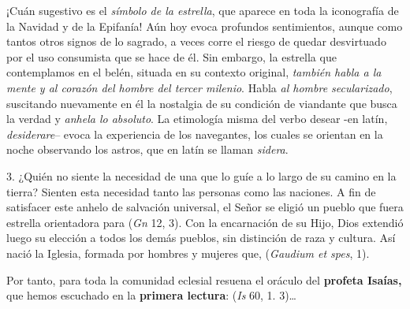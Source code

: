 ¡Cuán sugestivo es el \emph{símbolo de la estrella}, que aparece en toda la iconografía de la Navidad y de la Epifanía! Aún hoy evoca profundos sentimientos, aunque como tantos otros signos de lo sagrado, a veces corre el riesgo de quedar desvirtuado por el uso consumista que se hace de él. Sin embargo, la estrella que contemplamos en el belén, situada en su contexto original, \emph{también habla a la mente y al corazón del hombre del tercer milenio}. Habla \emph{al hombre secularizado}, suscitando nuevamente en él la nostalgia de su condición de viandante que busca la verdad y \emph{anhela lo absoluto}. La etimología misma del verbo desear -en latín, \emph{desiderare}-- evoca la experiencia de los navegantes, los cuales se orientan en la noche observando los astros, que en latín se llaman \emph{sidera}.

3. ¿Quién no siente la necesidad de una  que lo guíe a lo largo de su camino en la tierra? Sienten esta necesidad tanto las personas como las naciones. A fin de satisfacer este anhelo de salvación universal, el Señor se eligió un pueblo que fuera estrella orientadora para  (\emph{Gn} 12, 3). Con la encarnación de su Hijo, Dios extendió luego su elección a todos los demás pueblos, sin distinción de raza y cultura. Así nació la Iglesia, formada por hombres y mujeres que,  (\emph{Gaudium et spes}, 1).

Por tanto, para toda la comunidad eclesial resuena el oráculo del \textbf{profeta Isaías,} que hemos escuchado en la \textbf{primera lectura}:  (\emph{Is} 60, 1. 3)\ldots{}

